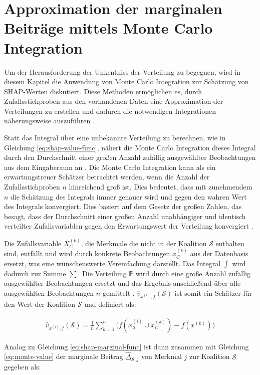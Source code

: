 \section{Approximation der marginalen Beiträge mittels Monte Carlo Integration}

Um der Herausforderung der Unkentniss der Verteilung zu begegnen, wird in diesem Kapitel die Anwendung von Monte Carlo Integration 
zur Schätzung von SHAP-Werten diskutiert. Diese Methoden ermöglichen es, durch Zufallsstichproben aus den vorhandenen Daten 
eine Approximation der Verteilungen zu erstellen und dadurch die notwendigen Integrationen näherungsweise auszuführen \cite[S. 34]{Molnar_2023}. 

Statt das Integral über eine unbekannte Verteilung zu berechnen, wie in Gleichung \ref{eq:shap-value-func},
nähert die Monte Carlo Integration dieses Integral durch den Durchschnitt einer großen Anzahl zufällig 
ausgewählter Beobachtungen aus dem Eingaberaum an \cite[S. 34]{Molnar_2023}. Die Monte Carlo Integration kann als ein erwartungstreuer Schätzer 
betrachtet werden, wenn die Anzahl der Zufallsstichproben $n$ hinreichend groß ist. Dies bedeutet, dass mit zunehmendem $n$ die Schätzung des Integrals 
immer genauer wird und gegen den wahren Wert des Integrals konvergiert. Dies basiert auf dem Gesetz der großen Zahlen, 
das besagt, dass der Durchschnitt einer großen Anzahl unabhängiger und identisch verteilter Zufallsvariablen gegen den Erwartungswert der Verteilung konvergiert \cite[S. 83]{Robert_Casella_2004}. 

Die Zufallsvariable $X_{C}^{(k)}$, die Merkmale die nicht in der Koalition $\mathcal{S}$ enthalten sind, 
entfällt und wird durch konkrete Beobachtungen $x_{C}^{(k)}$ aus der Datenbasis ersetzt, 
was eine wünschenswerte Vereinfachung darstellt. Das Integral $\int$ wird dadurch zur Summe $\sum$. Die Verteilung $\mathbb{P}$ wird durch eine große Anzahl zufällig 
ausgewählter Beobachtungen ersetzt und das Ergebnis anschließend über alle ausgewählten Beobachtungen $n$ gemittelt \cite[S. 36]{Molnar_2023}. 
$\hat{v}_{x^{(i)}, f}(\mathcal{S})$ ist somit ein Schätzer für den Wert der Koalition $\mathcal{S}$ und definiert als: 

\begin{align}
    \label{eq:monte-value}
    \hat{v}_{x^{(i)},f}(\mathcal{S}) = \frac{1}{n} \sum_{k=1}^{n} \Big(f(x^{(i)}_{\mathcal{S}} \cup x^{(k)}_{C}) - f(x^{(k)}) \Big)
\end{align}

Analog zu Gleichung \ref{eq:shap-marginal-func} ist dann zusammen mit Gleichung \ref{eq:monte-value} der marginale Beitrag 
$\hat{\Delta}_{\mathcal{S}, j}$ von Merkmal $j$ zur Koalition $\mathcal{S}$ gegeben als: 

